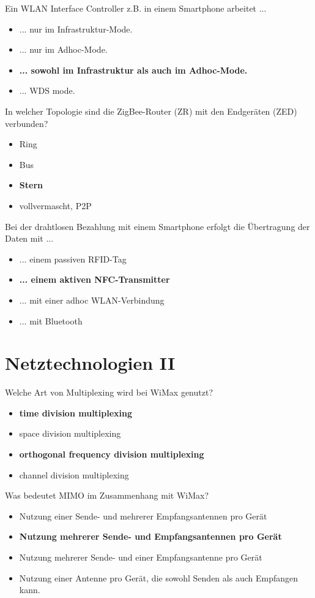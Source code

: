 \documentclass{article}
\begin{document}
	Ein WLAN Interface Controller z.B. in einem Smartphone arbeitet ... 
	\begin{itemize}
		\item ... nur im Infrastruktur-Mode.
		\item ... nur im Adhoc-Mode.
		\item \textbf{... sowohl im Infrastruktur als auch im Adhoc-Mode. }
		\item ... WDS mode.
	\end{itemize}

	In welcher Topologie sind die ZigBee-Router (ZR) mit den Endgeräten (ZED) verbunden? 
	\begin{itemize}
		\item Ring
		\item Bus
		\item \textbf{Stern}
		\item vollvermascht, P2P
	\end{itemize}

	Bei der drahtlosen Bezahlung mit einem Smartphone erfolgt die Übertragung der Daten mit ...
	\begin{itemize}
		\item ... einem passiven RFID-Tag 
		\item \textbf{... einem aktiven NFC-Transmitter}
		\item ... mit einer adhoc WLAN-Verbindung 
		\item ... mit Bluetooth 
	\end{itemize}
	
	\section{Netztechnologien II}
	
	Welche Art von Multiplexing wird bei WiMax genutzt?
	\begin{itemize}
		\item \textbf{time division multiplexing}
		\item space division multiplexing
		\item \textbf{orthogonal frequency division multiplexing}
		\item channel division multiplexing
	\end{itemize}

	Was bedeutet MIMO im Zusammenhang mit WiMax? 
	\begin{itemize}
		\item Nutzung einer Sende- und mehrerer Empfangsantennen pro Gerät
		\item \textbf{Nutzung mehrerer Sende- und Empfangsantennen pro Gerät}
		\item Nutzung mehrerer Sende- und einer Empfangsantenne pro Gerät 
		\item Nutzung einer Antenne pro Gerät, die sowohl Senden als auch Empfangen kann. 
	\end{itemize}
\end{document}
